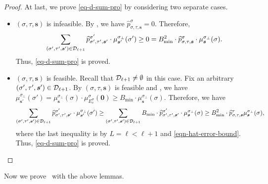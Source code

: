 \documentclass[11pt]{article}
\newcommand{\zero}{\boldsymbol{0}}
\newcommand{\seqS}{\boldsymbol{s}}
\begin{document}
\begin{proof}
At last, we prove \eqref{eq-d-sum-pro} by considering two separate cases.
\begin{itemize}
\item $(\sigma,\tau,\seqS)$ is infeasible. 
By , we have $\widehat{p}^{\sigma}_{\sigma,\tau,\seqS} = 0$.
Therefore, 
\begin{align*}
\sum_{(\sigma',\tau',\seqS')\in \+D_{\ell+1}} \widehat{p}^{\sigma'}_{\sigma',\tau',\seqS'}\cdot \mu^{\sigma_{\bot}}_{\seqS'}(\sigma') \geq 0 = B_{\min}^2\cdot\widehat{p}^{\sigma}_{\sigma,\tau,\seqS}\cdot \mu^{\sigma_{\bot}}_{\seqS}(\sigma).
\end{align*}
Thus, \eqref{eq-d-sum-pro} is proved.
\item $(\sigma,\tau,\seqS)$ is feasible. Recall that $\mathcal{D}_{\ell+1}\neq \emptyset$ in this case. Fix an arbitrary $(\sigma',\tau',\seqS')\in \+D_{\ell+1}$. By $(\sigma,\tau,\seqS)$ is feasible and ,
we have 
$\mu^{\sigma_{\bot}}_{\seqS'}(\sigma') = \mu^{\sigma_{\bot}}_{\seqS}(\sigma)\cdot \mu_{E_v^\sigma}^{\sigma}(\zero) \ge B_{\min}\cdot\mu^{\sigma_{\bot}}_{\seqS}(\sigma)$.
Therefore, we have 
\begin{align*}
\sum_{(\sigma',\tau',\seqS')\in \+D_{\ell+1}} \widehat{p}^{\sigma'}_{\sigma',\tau',\seqS'}\cdot \mu^{\sigma_{\bot}}_{\seqS'}(\sigma') 
\geq \sum_{(\sigma',\tau',\seqS')\in \+D_{\ell+1}} B_{\min}\cdot\widehat{p}^{\sigma'}_{\sigma',\tau',\seqS'}\cdot \mu^{\sigma_{\bot}}_{\seqS}(\sigma) \geq B_{\min}^2 \cdot \widehat{p}^{\tau}_{\sigma,\tau,\seqS}\mu^{\sigma_{\bot}}_{\seqS}(\sigma),
\end{align*}
where the last inequality is by $L=\ell<\ell+1$ and \eqref{eqn-hat-error-bound}. Thus, \eqref{eq-d-sum-pro} is proved.
\end{itemize}
\end{proof}

Now we prove~ with the above lemmas.
\end{document}

